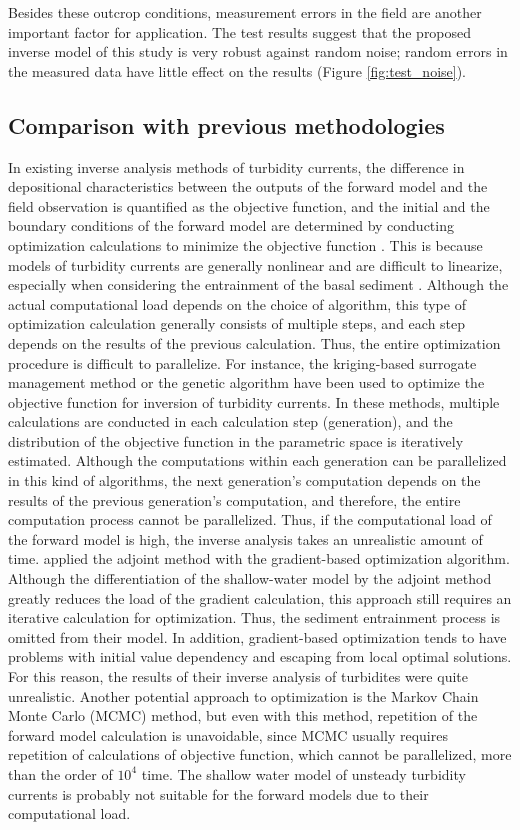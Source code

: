 Besides these outcrop conditions, measurement errors in the field are another important factor for application. The test results suggest that the proposed inverse model of this study is very robust against random noise; random errors in the measured data have little effect on the results (Figure \ref{fig:test_noise}).

\subsection{Comparison with previous methodologies}
In existing inverse analysis methods of turbidity currents, the difference in depositional characteristics between the outputs of the forward model and the field observation is quantified as the objective function, and the initial and the boundary conditions of the forward model are determined by conducting optimization calculations to minimize the objective function \cite[e.g.,]{Nakao2017}. This is because models of turbidity currents are generally nonlinear and are difficult to linearize, especially when considering the entrainment of the basal sediment \citep{parker1986self}. Although the actual computational load depends on the choice of algorithm, this type of optimization calculation generally consists of multiple steps, and each step depends on the results of the previous calculation. Thus, the entire optimization procedure is difficult to parallelize. For instance, the kriging-based surrogate management method \citep{lesshafft2011towards} or the genetic algorithm \citep{Nakao2017} have been used to optimize the objective function for inversion of turbidity currents. In these methods, multiple calculations are conducted in each calculation step (generation), and the distribution of the objective function in the parametric space is iteratively estimated. Although the computations within each generation can be parallelized in this kind of algorithms, the next generation's computation depends on the results of the previous generation's computation, and therefore, the entire computation process cannot be parallelized. Thus, if the computational load of the forward model is high, the inverse analysis takes an unrealistic amount of time. \citet{Parkinson2017} applied the adjoint method with the gradient-based optimization algorithm. Although the differentiation of the shallow-water model by the adjoint method greatly reduces the load of the gradient calculation, this approach still requires an iterative calculation for optimization. Thus, the sediment entrainment process is omitted from their model. In addition, gradient-based optimization tends to have problems with initial value dependency and escaping from local optimal solutions. For this reason, the results of their inverse analysis of turbidites were quite unrealistic. Another potential approach to optimization is the Markov Chain Monte Carlo (MCMC) method, but even with this method, repetition of the forward model calculation is unavoidable, since MCMC usually requires repetition of calculations of objective function, which cannot be parallelized, more than the order of $10^4$ time. The shallow water model of unsteady turbidity currents is probably not suitable for the forward models due to their computational load.

